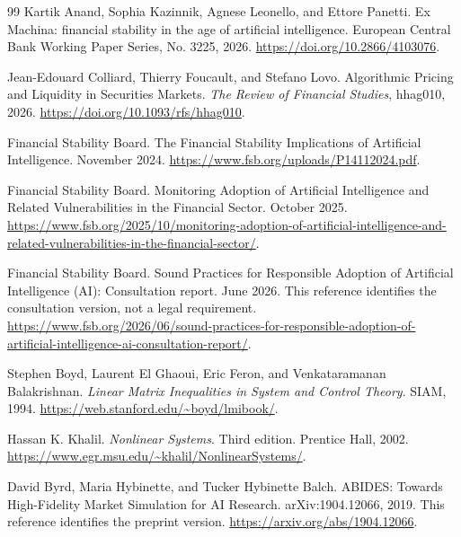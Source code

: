 \documentclass[11pt,a4paper]{article}
\theoremstyle{definition}
\theoremstyle{remark}
\begin{document}
\begin{thebibliography}{99}
Kartik Anand, Sophia Kazinnik, Agnese Leonello, and Ettore Panetti.
\newblock Ex Machina: financial stability in the age of artificial intelligence.
\newblock European Central Bank Working Paper Series, No. 3225, 2026.
\newblock \url{https://doi.org/10.2866/4103076}.

Jean-Edouard Colliard, Thierry Foucault, and Stefano Lovo.
\newblock Algorithmic Pricing and Liquidity in Securities Markets.
\newblock \emph{The Review of Financial Studies}, hhag010, 2026.
\newblock \url{https://doi.org/10.1093/rfs/hhag010}.

Financial Stability Board.
\newblock The Financial Stability Implications of Artificial Intelligence.
 November 2024.
\newblock \url{https://www.fsb.org/uploads/P14112024.pdf}.

Financial Stability Board.
\newblock Monitoring Adoption of Artificial Intelligence and Related Vulnerabilities in the Financial Sector.
 October 2025.
\newblock \url{https://www.fsb.org/2025/10/monitoring-adoption-of-artificial-intelligence-and-related-vulnerabilities-in-the-financial-sector/}.

Financial Stability Board.
\newblock Sound Practices for Responsible Adoption of Artificial Intelligence (AI): Consultation report.
 June 2026. This reference identifies the consultation version, not a legal requirement.
\newblock \url{https://www.fsb.org/2026/06/sound-practices-for-responsible-adoption-of-artificial-intelligence-ai-consultation-report/}.

Stephen Boyd, Laurent El Ghaoui, Eric Feron, and Venkataramanan Balakrishnan.
\newblock \emph{Linear Matrix Inequalities in System and Control Theory}.
\newblock SIAM, 1994.
\newblock \url{https://web.stanford.edu/~boyd/lmibook/}.

Hassan K. Khalil.
\newblock \emph{Nonlinear Systems}. Third edition.
\newblock Prentice Hall, 2002.
\newblock \url{https://www.egr.msu.edu/~khalil/NonlinearSystems/}.

David Byrd, Maria Hybinette, and Tucker Hybinette Balch.
\newblock ABIDES: Towards High-Fidelity Market Simulation for AI Research.
\newblock arXiv:1904.12066, 2019. This reference identifies the preprint version.
\newblock \url{https://arxiv.org/abs/1904.12066}.
\end{thebibliography}
\endgroup
\end{document}
